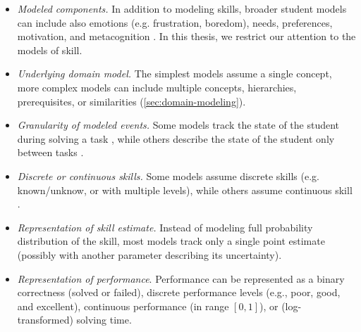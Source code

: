 \begin{itemize}
\item \emph{Modeled components.}
In addition to modeling skills, broader student models can
include also emotions (e.g. frustration, boredom), needs, preferences, motivation,
and metacognition \cite[ch.\,10]{affect-sensor-free,its-review-2010}.
In this thesis, we restrict our attention to the models of skill.
\item \emph{Underlying domain model.}
The simplest models assume a single concept,
more complex models can include multiple concepts,
hierarchies, prerequisites, or similarities (\cref{sec:domain-modeling}).
\item \emph{Granularity of modeled events.}
Some models track the state of the student during solving a task
\cite{bkt, sqltutor}, %
while others describe the state of the student only between tasks %
\cite{kli-framework}. %
\item \emph{Discrete or continuous skills.}
Some models assume discrete skills (e.g. known/unknow, or with multiple levels),
while others assume continuous skill
\cite{pelanek-learner-modeling}.
\item \emph{Representation of skill estimate.}
Instead of modeling full probability distribution of the skill, %
most models track only a single point estimate
(possibly with another parameter describing its uncertainty).
\item \emph{Representation of performance}.
  Performance can be represented as a binary correctness (solved or failed),
  discrete performance levels (e.g., poor, good, and excellent),
  continuous performance (in range $[0, 1]$),
  or (log-transformed) solving time.

\end{itemize}
